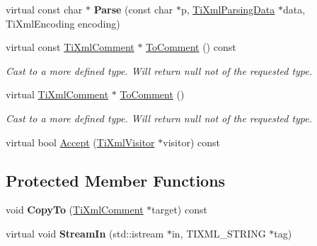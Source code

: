 \begin{DoxyCompactItemize}
\mbox{\label{class_ti_xml_comment_a43bddc18ac057734b41d84653b71d3e0}} 
virtual const char $\ast$ {\bfseries Parse} (const char $\ast$p, \hyperlink{class_ti_xml_parsing_data}{Ti\+Xml\+Parsing\+Data} $\ast$data, Ti\+Xml\+Encoding encoding)
\item 
\mbox{\label{class_ti_xml_comment_a1032e176d3eb73017ceabc698cac0f16}} 
virtual const \hyperlink{class_ti_xml_comment}{Ti\+Xml\+Comment} $\ast$ \hyperlink{class_ti_xml_comment_a1032e176d3eb73017ceabc698cac0f16}{To\+Comment} () const
\begin{DoxyCompactList}\small\item\em Cast to a more defined type. Will return null not of the requested type. \end{DoxyCompactList}\item 
\mbox{\label{class_ti_xml_comment_acc7c7e07e13c23f17797d642981511df}} 
virtual \hyperlink{class_ti_xml_comment}{Ti\+Xml\+Comment} $\ast$ \hyperlink{class_ti_xml_comment_acc7c7e07e13c23f17797d642981511df}{To\+Comment} ()
\begin{DoxyCompactList}\small\item\em Cast to a more defined type. Will return null not of the requested type. \end{DoxyCompactList}\item 
virtual bool \hyperlink{class_ti_xml_comment_ac894241530d1d266131a5026cb251a95}{Accept} (\hyperlink{class_ti_xml_visitor}{Ti\+Xml\+Visitor} $\ast$visitor) const
\end{DoxyCompactItemize}
\subsection*{Protected Member Functions}
\begin{DoxyCompactItemize}
\item 
\mbox{\label{class_ti_xml_comment_aaeb8a0b2d503f603879a2d04ceb54295}} 
void {\bfseries Copy\+To} (\hyperlink{class_ti_xml_comment}{Ti\+Xml\+Comment} $\ast$target) const
\item 
\mbox{\label{class_ti_xml_comment_a619467ff29c832b101e9b704a23c0357}} 
virtual void {\bfseries Stream\+In} (std\+::istream $\ast$in, T\+I\+X\+M\+L\+\_\+\+S\+T\+R\+I\+NG $\ast$tag)
\end{DoxyCompactItemize}
